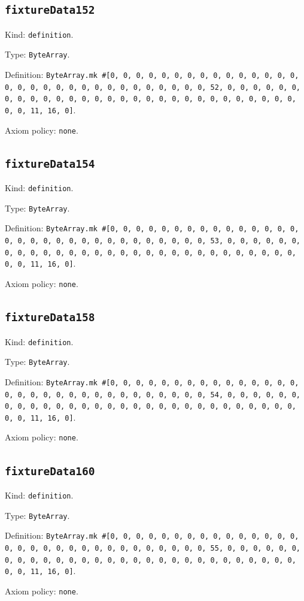 \documentclass[11pt]{article}
\begin{document}
\subsection*{\texttt{fixtureData152}}
\noindent Kind: \texttt{definition}.\par
\noindent Type: \texttt{ByteArray}.\par
\noindent Definition: \texttt{ByteArray.mk \#[0, 0, 0, 0, 0, 0, 0, 0, 0, 0, 0, 0, 0, 0, 0, 0, 0, 0, 0, 0, 0, 0, 0, 0, 0, 0, 0, 0, 0, 0, 0, 52, 0, 0, 0, 0, 0, 0, 0, 0, 0, 0, 0, 0, 0, 0, 0, 0, 0, 0, 0, 0, 0, 0, 0, 0, 0, 0, 0, 0, 0, 0, 0, 11, 16, 0]}.\par
\noindent Axiom policy: \texttt{none}.\par
\subsection*{\texttt{fixtureData154}}
\noindent Kind: \texttt{definition}.\par
\noindent Type: \texttt{ByteArray}.\par
\noindent Definition: \texttt{ByteArray.mk \#[0, 0, 0, 0, 0, 0, 0, 0, 0, 0, 0, 0, 0, 0, 0, 0, 0, 0, 0, 0, 0, 0, 0, 0, 0, 0, 0, 0, 0, 0, 0, 53, 0, 0, 0, 0, 0, 0, 0, 0, 0, 0, 0, 0, 0, 0, 0, 0, 0, 0, 0, 0, 0, 0, 0, 0, 0, 0, 0, 0, 0, 0, 0, 11, 16, 0]}.\par
\noindent Axiom policy: \texttt{none}.\par
\subsection*{\texttt{fixtureData158}}
\noindent Kind: \texttt{definition}.\par
\noindent Type: \texttt{ByteArray}.\par
\noindent Definition: \texttt{ByteArray.mk \#[0, 0, 0, 0, 0, 0, 0, 0, 0, 0, 0, 0, 0, 0, 0, 0, 0, 0, 0, 0, 0, 0, 0, 0, 0, 0, 0, 0, 0, 0, 0, 54, 0, 0, 0, 0, 0, 0, 0, 0, 0, 0, 0, 0, 0, 0, 0, 0, 0, 0, 0, 0, 0, 0, 0, 0, 0, 0, 0, 0, 0, 0, 0, 11, 16, 0]}.\par
\noindent Axiom policy: \texttt{none}.\par
\subsection*{\texttt{fixtureData160}}
\noindent Kind: \texttt{definition}.\par
\noindent Type: \texttt{ByteArray}.\par
\noindent Definition: \texttt{ByteArray.mk \#[0, 0, 0, 0, 0, 0, 0, 0, 0, 0, 0, 0, 0, 0, 0, 0, 0, 0, 0, 0, 0, 0, 0, 0, 0, 0, 0, 0, 0, 0, 0, 55, 0, 0, 0, 0, 0, 0, 0, 0, 0, 0, 0, 0, 0, 0, 0, 0, 0, 0, 0, 0, 0, 0, 0, 0, 0, 0, 0, 0, 0, 0, 0, 11, 16, 0]}.\par
\noindent Axiom policy: \texttt{none}.\par
\end{document}
